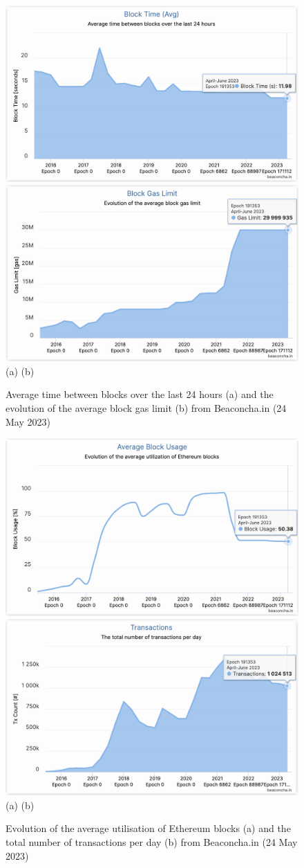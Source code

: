 \documentclass[UTF8]{article}
\begin{document}
{\begin{figure}[htbp]
\begin{center}
\includegraphics[width=0.48\linewidth]{images/bchart23}
\includegraphics[width=0.48\linewidth]{images/bchart24} \\
(a)\hspace{160pt}        (b)\\
\caption{Average time between blocks over the last 24 hours (a) and the evolution of the average block gas limit (b) from Beaconcha.in (24 May 2023)}
\label{fig:chart23}
\end{center}
\end{figure}

\begin{figure}[htbp]
\begin{center}
\includegraphics[width=0.48\linewidth]{images/bchart25}
\includegraphics[width=0.48\linewidth]{images/bchart26} \\
(a)\hspace{160pt}        (b)\\
\caption{Evolution of the average utilisation of Ethereum blocks (a) and the total number of transactions per day (b) from Beaconcha.in (24 May 2023)}
\label{fig:chart25}
\end{center}
\end{figure}

}
\end{document}
